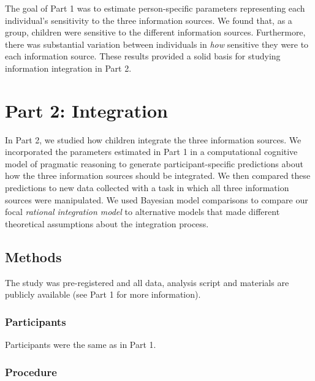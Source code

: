 \documentclass[
  man,floatsintext]{apa6}
\begin{document}
The goal of Part 1 was to estimate person-specific parameters representing each individual's sensitivity to the three information sources. We found that, as a group, children were sensitive to the different information sources. Furthermore, there was substantial variation between individuals in \emph{how} sensitive they were to each information source. These results provided a solid basis for studying information integration in Part 2.

\hypertarget{part-2-integration}{%
\section{Part 2: Integration}\label{part-2-integration}}

In Part 2, we studied how children integrate the three information sources. We incorporated the parameters estimated in Part 1 in a computational cognitive model of pragmatic reasoning to generate participant-specific predictions about how the three information sources should be integrated. We then compared these predictions to new data collected with a task in which all three information sources were manipulated. We used Bayesian model comparisons to compare our focal \emph{rational integration model} to alternative models that made different theoretical assumptions about the integration process.

\hypertarget{methods-1}{%
\subsection{Methods}\label{methods-1}}

The study was pre-registered and all data, analysis script and materials are publicly available (see Part 1 for more information).

\hypertarget{participants-1}{%
\subsubsection{Participants}\label{participants-1}}

Participants were the same as in Part 1.

\hypertarget{procedure-1}{%
\subsubsection{Procedure}\label{procedure-1}}
\end{document}
